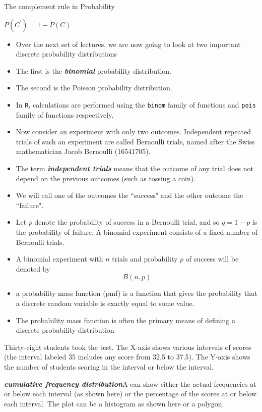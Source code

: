 \documentclass[12pt]{report}
\begin{document}

The complement rule in Probability

$P(C^{\prime}) = 1- P(C)$


{ \Large
	
	\begin{itemize}
		
		\item Over the next set of lectures, we are now going to look at two important discrete probability distributions
		
		\item The first is the \textbf{\emph{binomial}} probability distribution.
		
		\item The second is the Poisson probability distribution.
		
		\item In \texttt{R}, calculations are performed using the \texttt{binom} family of functions and \texttt{pois} family of functions respectively.
		
		\item Now consider an experiment with only two outcomes. Independent repeated trials of such an experiment are
		called Bernoulli trials, named after the Swiss mathematician Jacob Bernoulli (16541705). \item The term \textbf{\emph{independent
				trials}} means that the outcome of any trial does not depend on the previous outcomes (such as tossing a coin).
		\item We will call one of the outcomes the ``success" and the other outcome the ``failure".
		
		\item
		Let $p$ denote the probability of success in a Bernoulli trial, and so $q = 1 - p$ is the probability of failure.
		A binomial experiment consists of a fixed number of Bernoulli trials. \item A binomial experiment with $n$ trials and
		probability $p$ of success will be denoted by
		\[B(n, p)\]
		\item a probability mass function (pmf) is a function that gives the probability that a 
		discrete random variable is exactly equal to some value. 
		\item The probability mass function is often the primary means of defining a discrete probability distribution 
	\end{itemize}
}
{ \Large
	Thirty-eight students took the test. The X-axis shows various intervals of scores (the interval labeled 35 includes any score from 32.5 to 37.5). The Y-axis shows the number of students scoring in the interval or below the interval.
	
	\textbf{\emph{cumulative frequency distribution}}A  can show either the actual frequencies at or below each interval (as shown here) or the percentage of the scores at or below each interval. The plot can be a histogram as shown here or a polygon.
}
\end{document}
